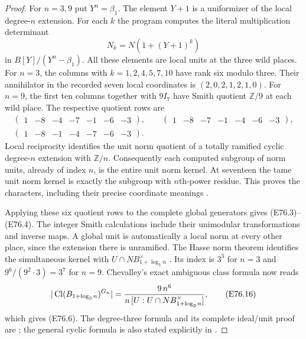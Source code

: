 \begin{proof}
For $n=3,9$ put $Y^n=\beta_1$. The element $Y+1$
is a uniformizer of the local degree-$n$ extension.
For each $k$ the program computes the literal
multiplication determinant
\[
                  N_k=N(1+(Y+1)^k)
 \tag{E76.14}
\]
in $B[Y]/(Y^n-\beta_1)$. All these elements are
local units at the three wild places. For $n=3$,
the columns with $k=1,2,4,5,7,10$ have rank six
modulo three. Their annihilator in the recorded
seven local coordinates is
$(2,0,2,1,2,1,0)$. For $n=9$, the first ten columns
together with $9I_7$ have Smith quotient $\mathbb Z/9$
at each wild place. The respective quotient rows are
\[
 \begin{gathered}
 \begin{pmatrix}1&-8&-4&-7&-1&-6&-3\end{pmatrix},\qquad
 \begin{pmatrix}1&-8&-7&-1&-4&-6&-3\end{pmatrix},\\[3pt]
 \begin{pmatrix}1&-8&-1&-4&-7&-6&-3\end{pmatrix}.
 \end{gathered}
 \tag{E76.15}
\]
Local reciprocity identifies the unit norm quotient
of a totally ramified cyclic degree-$n$ extension
with $\mathbb Z/n$. Consequently each computed
subgroup of norm units, already of index $n$, is
the entire unit norm kernel. At seventeen the tame
unit norm kernel is exactly the subgroup with
$n$th-power residue. This proves the characters,
including their precise coordinate meanings
\cite[III, Theorems~3.1, 3.4]{E_MilneCFT}.

Applying these six quotient rows to the complete
global generators gives (E76.3)--(E76.4). The
integer Smith calculations include their unimodular
transformations and inverse maps. A global unit
is automatically a local norm at every other
place, since the extension there is unramified.
The Hasse norm theorem identifies the simultaneous
kernel with $U\cap N B_{1+\log_3n}^{\times}$
\cite[VIII, Theorem~3.1]{E_MilneCFT}.
Its index is $3^3$ for $n=3$ and
$9^6/(9^2\cdot3)=3^7$ for $n=9$.
Chevalley's exact ambiguous class formula now reads
\[
 |\operatorname{Cl}(B_{1+\log_3n})^{G_n}|
   ={9\,n^6\over n\,[U:U\cap N B_{1+\log_3n}^{\times}]},
 \tag{E76.16}
\]
which gives (E76.6). The degree-three formula and
its complete ideal/unit proof are
\cite[Theorem~1]{E_LemmermeyerAmbiguous}; the general
cyclic formula is also stated explicitly in
\cite[Theorem~2.6, Remark~2.7(2), Lemma~2.8]{E_LOXZKummer}.


\end{proof}
